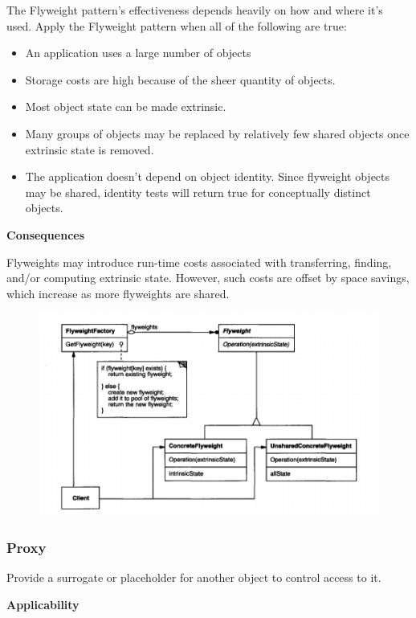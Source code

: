 \documentclass{article}
\begin{document}
The Flyweight pattern's effectiveness depends heavily on how and where it's
used. Apply the Flyweight pattern when all of the following are true:
\begin{itemize}
    \item An application uses a large number of objects
    \item Storage costs are high because of the sheer quantity of objects.
    \item Most object state can be made extrinsic.
    \item Many groups of objects may be replaced by relatively few shared objects once extrinsic state is removed.
    \item The application doesn't depend on object identity. Since flyweight objects may be shared, identity tests will return true for conceptually distinct objects.
\end{itemize}

\textbf{Consequences}

Flyweights may introduce run-time costs associated with transferring, finding,
and/or computing extrinsic state. However, such costs are offset by space savings, which increase as more flyweights are shared.


\begin{figure}[h]
    \centering
    \includegraphics[width=14cm]{diagrams/pattern-11-flyweight.png}
\end{figure}


\newpage
\subsubsection{Proxy}
Provide a surrogate or placeholder for another object to control access to it.

\textbf{Applicability}
\end{document}
